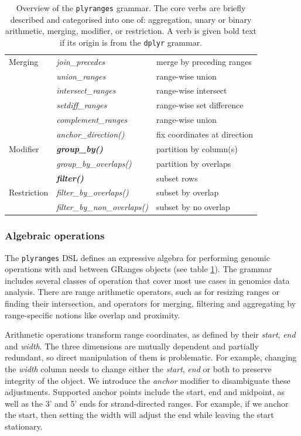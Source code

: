 \documentclass[]{article}
\begin{document}
\begin{table}[!htbp]
\begin{tabular}{|l|l|p{6cm}|}
    Merging & \emph{join\_precedes} & merge by preceding ranges \\
    & \emph{union\_ranges} & range-wise union \\
    & \emph{intersect\_ranges} & range-wise intersect \\
    & \emph{setdiff\_ranges} & range-wise set difference \\
    & \emph{complement\_ranges} & range-wise union \\
  \hline
   & \emph{anchor\_direction()} & fix coordinates at direction \\
  Modifier & \textbf{\emph{group\_by()}} & partition by column(s)  \\ 
   & \emph{group\_by\_overlaps()} & partition by overlaps \\
   \hline
   & \textbf{\emph{filter()}} & subset rows \\
  Restriction & \emph{filter\_by\_overlaps()} & subset by overlap \\
    & \emph{filter\_by\_non\_overlaps()} & subset by no overlap \\
   \hline
\end{tabular}
\caption{Overview of the \texttt{plyranges} grammar. The core verbs are
briefly described and categorised into one of: aggregation, unary or binary
arithmetic, merging, modifier, or restriction. A verb is given bold text if
its origin is from the \texttt{dplyr} grammar.}\label{tab:grammar}
\end{table}

\hypertarget{algebraic-operations}{%
\subsubsection{Algebraic operations}\label{algebraic-operations}}

The \texttt{plyranges} DSL defines an expressive algebra for performing
genomic operations with and between GRanges objects (see table
\ref{tab:grammar}). The grammar includes several classes of operation
that cover most use cases in genomics data analysis. There are range
arithmetic operators, such as for resizing ranges or finding their
intersection, and operators for merging, filtering and aggregating by
range-specific notions like overlap and proximity.

Arithmetic operations transform range coordinates, as defined by their
\emph{start}, \emph{end} and \emph{width}. The three dimensions are
mutually dependent and partially redundant, so direct manipulation of
them is problematic. For example, changing the \emph{width} column needs
to change either the \emph{start}, \emph{end} or both to preserve
integrity of the object. We introduce the \emph{anchor} modifier to
disambiguate these adjustments. Supported anchor points include the
start, end and midpoint, as well as the 3' and 5' ends for
strand-directed ranges. For example, if we anchor the start, then
setting the width will adjust the end while leaving the start
stationary.
\end{document}
